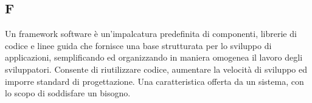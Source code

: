 \begin{center}
\section*{F}
\end{center}
Un framework software è un'impalcatura predefinita di componenti, librerie di codice e linee guida che fornisce una base strutturata per lo sviluppo di applicazioni, semplificando ed organizzando in maniera omogenea il lavoro degli sviluppatori. Consente di riutilizzare codice, aumentare la velocità di sviluppo ed imporre standard di progettazione.
Una caratteristica offerta da un sistema, con lo scopo di soddisfare un bisogno.
